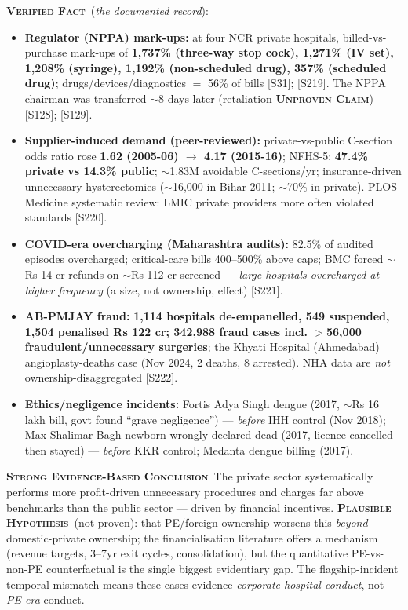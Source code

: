 \documentclass[11pt,a4paper]{article}
\newcommand{\VF}{\textcolor{vfcol}{\textsc{\textbf{Verified Fact}}}}
\newcommand{\SE}{\textcolor{secol}{\textsc{\textbf{Strong Evidence-Based Conclusion}}}}
\newcommand{\PH}{\textcolor{phcol}{\textsc{\textbf{Plausible Hypothesis}}}}
\newcommand{\UC}{\textcolor{uccol}{\textsc{\textbf{Unproven Claim}}}}
\newcommand{\cs}[1]{\textnormal{[#1]}}
\begin{document}
\VF\ (\emph{the documented record}):
\begin{itemize}[leftmargin=1.4em,itemsep=2pt]
\item \textbf{Regulator (NPPA) mark-ups:} at four NCR private hospitals, billed-vs-purchase mark-ups of \textbf{1{,}737\% (three-way stop cock), 1{,}271\% (IV set), 1{,}208\% (syringe), 1{,}192\% (non-scheduled drug), 357\% (scheduled drug)}; drugs/devices/diagnostics $=$ 56\% of bills \cs{S31}; \cs{S219}. The NPPA chairman was transferred $\sim$8 days later (retaliation \UC) \cs{S128}; \cs{S129}.
\item \textbf{Supplier-induced demand (peer-reviewed):} private-vs-public C-section odds ratio rose \textbf{1.62 (2005-06) $\rightarrow$ 4.17 (2015-16)}; NFHS-5: \textbf{47.4\% private vs 14.3\% public}; $\sim$1.83M avoidable C-sections/yr; insurance-driven unnecessary hysterectomies ($\sim$16{,}000 in Bihar 2011; $\sim$70\% in private). PLOS Medicine systematic review: LMIC private providers more often violated standards \cs{S220}.
\item \textbf{COVID-era overcharging (Maharashtra audits):} 82.5\% of audited episodes overcharged; critical-care bills 400--500\% above caps; BMC forced $\sim$Rs 14 cr refunds on $\sim$Rs 112 cr screened --- \emph{large hospitals overcharged at higher frequency} (a size, not ownership, effect) \cs{S221}.
\item \textbf{AB-PMJAY fraud:} \textbf{1{,}114 hospitals de-empanelled, 549 suspended, 1{,}504 penalised Rs 122 cr; 342{,}988 fraud cases incl. $>$56{,}000 fraudulent/unnecessary surgeries}; the Khyati Hospital (Ahmedabad) angioplasty-deaths case (Nov 2024, 2 deaths, 8 arrested). NHA data are \emph{not} ownership-disaggregated \cs{S222}.
\item \textbf{Ethics/negligence incidents:} Fortis Adya Singh dengue (2017, $\sim$Rs 16 lakh bill, govt found ``grave negligence'') --- \emph{before} IHH control (Nov 2018); Max Shalimar Bagh newborn-wrongly-declared-dead (2017, licence cancelled then stayed) --- \emph{before} KKR control; Medanta dengue billing (2017).
\end{itemize}

\SE\ The private sector systematically performs more profit-driven unnecessary procedures and charges far above benchmarks than the public sector --- driven by financial incentives. \PH\ (not proven): that PE/foreign ownership worsens this \emph{beyond} domestic-private ownership; the financialisation literature offers a mechanism (revenue targets, 3--7yr exit cycles, consolidation), but the quantitative PE-vs-non-PE counterfactual is the single biggest evidentiary gap. The flagship-incident temporal mismatch means these cases evidence \emph{corporate-hospital conduct}, not \emph{PE-era} conduct.
\end{document}
